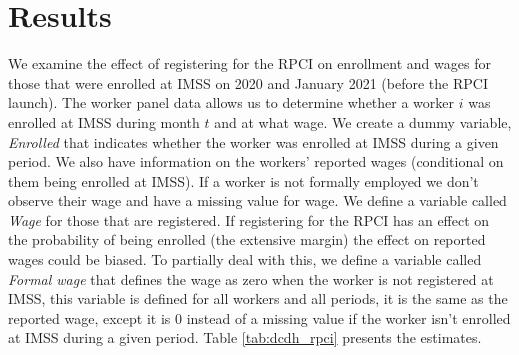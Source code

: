 \documentclass[oneside,11pt]{article}
\begin{document}


\section{Results} \label{results}

We examine the effect of registering for the RPCI on enrollment and wages for those that were enrolled at IMSS on 2020 and January 2021 (before the RPCI launch). The worker panel data allows us to determine whether a worker $i$ was enrolled at IMSS during month $t$ and at what wage. We create a dummy variable, \textit{Enrolled} that indicates whether the worker was enrolled at IMSS during a given period. We also have information on the workers' reported wages (conditional on them being enrolled at IMSS). If a worker is not formally employed we don't observe their wage and have a missing value for wage. We define a variable called \textit{Wage} for those that are registered. If registering for the RPCI has an effect on the probability of being enrolled (the extensive margin) the effect on reported wages could be biased. To partially deal with this, we define a variable called \textit{Formal wage} that defines the wage as zero when the worker is not registered at IMSS, this variable is defined for all workers and all periods, it is the same as the reported wage, except it is 0 instead of a missing value if the worker isn't enrolled at IMSS during a given period. Table \ref{tab:dcdh_rpci} presents the estimates. 
\end{document}
